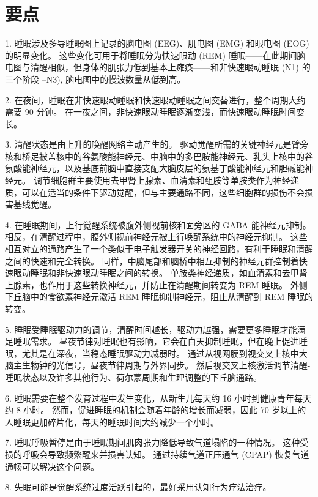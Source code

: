 \section{要点}

1. 睡眠涉及多导睡眠图上记录的脑电图 (EEG)、肌电图 (EMG) 和眼电图 (EOG) 的明显变化。
这些变化可用于将睡眠分为快速眼动 (REM) 睡眠——在此期间脑电图与清醒相似，但身体的肌张力低到基本上瘫痪——和非快速眼动睡眠 (N1) 的三个阶段 –N3), 脑电图中的慢波数量从低到高。 


2. 在夜间，睡眠在非快速眼动睡眠和快速眼动睡眠之间交替进行，整个周期大约需要 90 分钟。
在一夜之间，非快速眼动睡眠逐渐变浅，而快速眼动睡眠时间变长。


3. 清醒状态是由上升的唤醒网络主动产生的。
驱动觉醒所需的关键神经元是臂旁核和桥足被盖核中的谷氨酸能神经元、中脑中的多巴胺能神经元、乳头上核中的谷氨酸能神经元，以及基底前脑中直接支配大脑皮层的氨基丁酸能神经元和胆碱能神经元。
调节细胞群主要使用去甲肾上腺素、血清素和组胺等单胺类作为神经递质，可以在适当的条件下驱动觉醒，但与主要通路不同，这些细胞群的损伤不会损害基线觉醒。 


4. 在睡眠期间，上行觉醒系统被腹外侧视前核和面旁区的 GABA 能神经元抑制。
相反，在清醒过程中，腹外侧视前神经元被上行唤醒系统中的神经元抑制。
这些相互对立的通路产生了一个类似于电子触发器开关的神经回路，有利于睡眠和清醒之间的快速和完全转换。
同样，中脑尾部和脑桥中相互抑制的神经元群控制着快速眼动睡眠和非快速眼动睡眠之间的转换。
单胺类神经递质，如血清素和去甲肾上腺素，也作用于这些转换神经元，并防止在清醒期间转变为 REM 睡眠。
外侧下丘脑中的食欲素神经元激活 REM 睡眠抑制神经元，阻止从清醒到 REM 睡眠的转变。


5. 睡眠受睡眠驱动力的调节，清醒时间越长，驱动力越强，需要更多睡眠才能满足睡眠需求。
昼夜节律对睡眠也有影响，它会在白天抑制睡眠，但在晚上促进睡眠，尤其是在深夜，当稳态睡眠驱动力减弱时。
通过从视网膜到视交叉上核中大脑主生物钟的光信号，昼夜节律周期与外界同步。
然后视交叉上核激活调节清醒-睡眠状态以及许多其他行为、荷尔蒙周期和生理调整的下丘脑通路。


6. 睡眠需要在整个发育过程中发生变化，从新生儿每天约 16 小时到健康青年每天约 8 小时。
然而，促进睡眠的机制会随着年龄的增长而减弱，因此 70 岁以上的人睡眠更加碎片化，每天的睡眠时间大约减少一个小时。


7. 睡眠呼吸暂停是由于睡眠期间肌肉张力降低导致气道塌陷的一种情况。
这种受损的呼吸会导致频繁醒来并损害认知。
通过持续气道正压通气 (CPAP) 恢复气道通畅可以解决这个问题。


8. 失眠可能是觉醒系统过度活跃引起的，最好采用认知行为疗法治疗。


